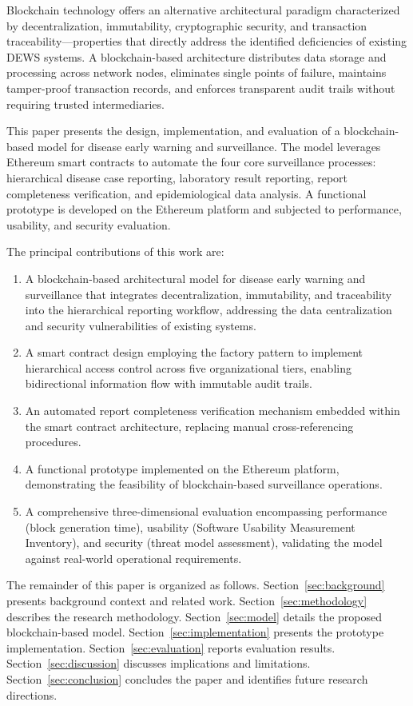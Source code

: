 \documentclass[AMA,LATO1COL]{WileyNJD-v2}
\begin{document}
Blockchain technology offers an alternative architectural paradigm characterized by decentralization, immutability, cryptographic security, and transaction traceability---properties that directly address the identified deficiencies of existing DEWS systems. A blockchain-based architecture distributes data storage and processing across network nodes, eliminates single points of failure, maintains tamper-proof transaction records, and enforces transparent audit trails without requiring trusted intermediaries.

This paper presents the design, implementation, and evaluation of a blockchain-based model for disease early warning and surveillance. The model leverages Ethereum smart contracts to automate the four core surveillance processes: hierarchical disease case reporting, laboratory result reporting, report completeness verification, and epidemiological data analysis. A functional prototype is developed on the Ethereum platform and subjected to performance, usability, and security evaluation.

The principal contributions of this work are:
\begin{enumerate}
\item A blockchain-based architectural model for disease early warning and surveillance that integrates decentralization, immutability, and traceability into the hierarchical reporting workflow, addressing the data centralization and security vulnerabilities of existing systems.
\item A smart contract design employing the factory pattern to implement hierarchical access control across five organizational tiers, enabling bidirectional information flow with immutable audit trails.
\item An automated report completeness verification mechanism embedded within the smart contract architecture, replacing manual cross-referencing procedures.
\item A functional prototype implemented on the Ethereum platform, demonstrating the feasibility of blockchain-based surveillance operations.
\item A comprehensive three-dimensional evaluation encompassing performance (block generation time), usability (Software Usability Measurement Inventory), and security (threat model assessment), validating the model against real-world operational requirements.
\end{enumerate}

The remainder of this paper is organized as follows. Section~\ref{sec:background} presents background context and related work. Section~\ref{sec:methodology} describes the research methodology. Section~\ref{sec:model} details the proposed blockchain-based model. Section~\ref{sec:implementation} presents the prototype implementation. Section~\ref{sec:evaluation} reports evaluation results. Section~\ref{sec:discussion} discusses implications and limitations. Section~\ref{sec:conclusion} concludes the paper and identifies future research directions.
\end{document}
